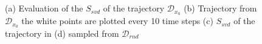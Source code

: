 \documentclass{article}
\begin{document}
\begin{figure}
    \\
    \\
    
    \caption{(a) Evaluation of the $S_{svd}$ of the trajectory $\mathcal{D}_{x_{0}}$ (b) Trajectory from $\mathcal{D}_{x_0}$ the white points are plotted every 10 time steps (c) $S_{svd}$ of the trajectory in (d) sampled from $\mathcal{D}_{rnd}$}
    \label{fig:growth_svd}

\end{figure}
\end{document}
